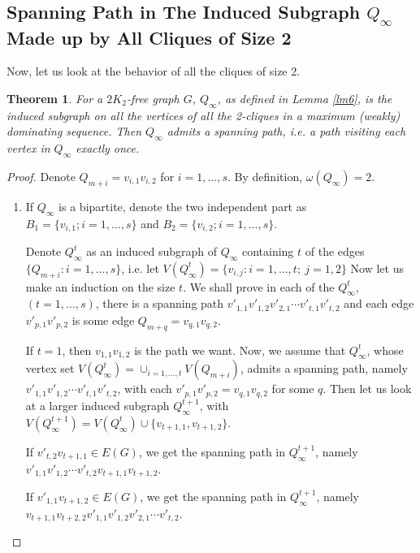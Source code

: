 \documentclass{amsart}
\newtheorem{theorem}{Theorem}
\begin{document}
\subsection{Spanning Path in The Induced Subgraph $Q_{\infty}$ Made up by All Cliques of Size 2}
Now, let us look at the behavior of all the cliques of size 2.
\begin{theorem}\label{thm4}
For a $2K_2$-free graph $G$, $Q_{\infty}$, as defined in Lemma \ref{lm6}, is the induced subgraph on all the vertices of all the 2-cliques in a maximum (weakly) dominating sequence. 
Then $Q_{\infty}$ admits a spanning path, i.e. a path visiting each vertex in $Q_{\infty}$ exactly once.
\end{theorem}


\begin{proof}
Denote $Q_{m+i}=v_{i,1}v_{i,2}$ for $i=1,\ldots,s$. By definition, $\omega(Q_{\infty})=2$.
\begin{enumerate}

\item If $Q_{\infty}$ is a bipartite, denote the two independent part as $B_1=\{v_{i,1};i=1,\ldots,s\}$ and $B_2=\{v_{i,2};i=1,\ldots,s\}$. 


Denote $Q^t_{\infty}$ as an induced subgraph of $Q_{\infty}$ containing $t$ of the edges $\{Q_{m+i}:i=1,\ldots,s\}$, i.e. let $V(Q^t_{\infty})=\{v_{i,j}:i=1,\ldots,t;~j=1,2\}$
Now let us make an induction on the size $t$. We shall prove in each of the $Q^t_{\infty}$, $(t=1,\ldots,s)$, there is a spanning path $v'_{1,1}v'_{1,2}v'_{2,1}\cdots v'_{t,1}v'_{t,2}$ and each edge $v'_{p,1}v'_{p,2}$ is some edge $Q_{m+q}=v_{q,1}v_{q,2}$.


If $t=1$, then $v_{1,1}v_{1,2}$ is the path we want. Now, we assume that $Q^t_{\infty}$, whose vertex set $V(Q^t_{\infty})=\cup_{i=1,\ldots,t}V(Q_{m+i})$, admits a spanning path, namely $v'_{1,1}v'_{1,2}\cdots v'_{t,1}v'_{t,2}$, with each $v'_{p,1}v'_{p,2}=v_{q,1}v_{q,2}$ for some $q$. Then let us look at a larger induced subgraph $Q^{t+1}_{\infty}$, with $V(Q^{t+1}_{\infty})=V(Q^t_{\infty})\cup\{v_{t+1,1},v_{t+1,2}\}$.

If $v'_{t,2}v_{t+1,1}\in E(G)$, we get the spanning path in $Q^{t+1}_{\infty}$, 
namely\\ $v'_{1,1} v'_{1,2}\cdots v'_{t,2} v_{t+1,1} v_{t+1,2}$.

If $v'_{1,1}v_{t+1,2}\in E(G)$, we get the spanning path in $Q^{t+1}_{\infty}$, 
namely\\ $v_{t+1,1} v_{t+2,2} v'_{1,1} v'_{1,2} v'_{2,1}\cdots v'_{t,2}$.


\end{enumerate}
\end{proof}
\end{document}

